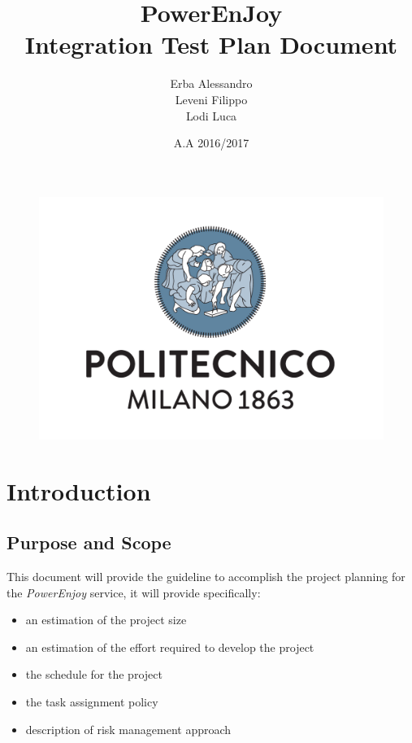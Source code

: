 \documentclass[english]{article}
\newcommand{\powerenjoy}{\textit{PowerEnjoy }}
\begin{document}
	\begin{figure}
		\centering
		\includegraphics[scale=0.5]{Images/logo.pdf} 
	\end{figure}


	\title{PowerEnJoy\\
	Integration Test Plan Document\\
	}

	\date{A.A 2016/2017}
	
	\author{Erba Alessandro\\
	 Leveni Filippo\\
	 Lodi Luca}
	
	\maketitle
	\pagebreak{}
	\tableofcontents{} 
	\pagebreak{}
\section{Introduction}
\subsection{Purpose and Scope}
	This document will provide the guideline to accomplish the project planning for the \powerenjoy service, it will provide specifically:
	\begin{itemize}
		\item an estimation of the project size 
		\item an estimation of the effort required to develop the project
		\item the schedule for the project
		\item the task assignment policy
		\item description of risk management approach
	\end{itemize}
\end{document}
